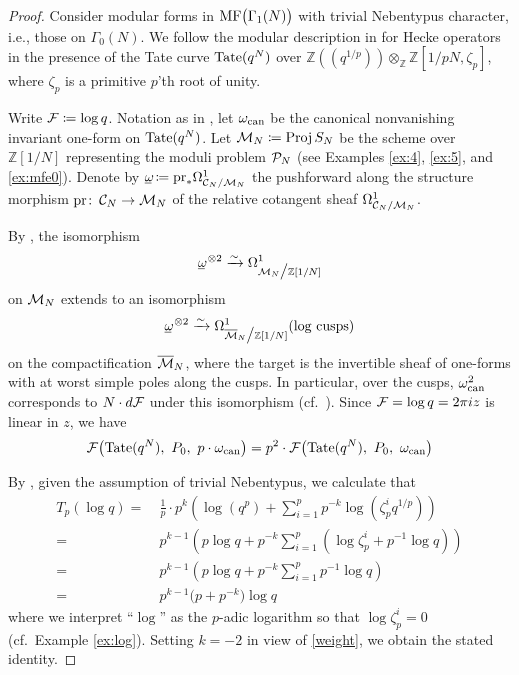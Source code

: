 \documentclass{gtpart}
\theoremstyle{definition}
\theoremstyle{remark}
\def\co{\colon\thinspace}
\newcommand{\mb}[1]{\mathbb{#1}}
\newcommand{\Proj}{{\rm Proj\thinspace}}
\newcommand{\CC}{{\cal C}}
\newcommand{\CF}{{\cal F}}
\newcommand{\CM}{{\cal M}}
\newcommand{\CMB}{\overline {\cal M}}
\newcommand{\CP}{{\cal P}}
\newcommand{\BZ}{{\mb Z}}
\newcommand{\can}{{\rm can}}
\newcommand{\MF}{{\rm MF}}
\newcommand{\G}{\Gamma}
\renewcommand{\o}{\omega}
\newcommand{\ou}{\underline{\omega\!}}
\newcommand{\ce}{\coloneqq}
\newcommand{\lp}{(\!(}
\newcommand{\rp}{)\!)}
\renewcommand{\=}{\approx}
\renewcommand{\-}{\sim}
\newcommand{\Tate}{{\rm Tate}}
\numberwithin{equation}{section}
\numberwithin{thm}{section}
\begin{document}
\begin{proof}
 Consider modular forms in $\MF\big(\G_1(N)\big)$ with trivial Nebentypus 
 character, i.e., those on $\G_0(N)$.  We follow the modular description in 
 \cite[Section 1.11]{padicprop} for Hecke operators in the presence of the Tate 
 curve $\Tate(q^N)$ over 
 $\BZ \lp q^{1 / p} \rp \otimes_\BZ \BZ [1 / p N, \zeta_p]$, where $\zeta_p$ is 
 a primitive $p$'th root of unity.  

 Write $\CF \ce \log q$.  Notation as in \cite[Section 1.2]{padicprop}, let 
 $\o_\can$ be the canonical nonvanishing invariant one-form on $\Tate(q^N)$.  
 Let $\CM_N \ce \Proj S_N$ be the scheme over $\BZ[1/N]$ representing the moduli 
 problem $\CP_N$ (see Examples \ref{ex:4}, \ref{ex:5}, and \ref{ex:mfe0}).  
 Denote by $\ou \ce {\rm pr}_* \Omega^1_{\CC_N/\CM_N}$ the pushforward along the 
 structure morphism ${\rm pr} \co \CC_N \to \CM_N$ of the relative cotangent 
 sheaf $\Omega^1_{\CC_N/\CM_N}$.  

 By \cite[Theorem 10.13.11]{KM}, the isomorphism 
 \[
  \ou^{~\! \otimes 2} \xrightarrow{\sim} \Omega^1_{\CM_N \big/ \BZ[1/N]} 
 \]
 on $\CM_N$ extends to an isomorphism 
 \[
  \ou^{~\! \otimes 2} \xrightarrow{\sim} 
  \Omega^1_{\CMB_N \big/ \BZ[1/N]} (\text{log cusps}) 
 \]
 on the compactification $\CMB_N$, where the target is the invertible sheaf of 
 one-forms with at worst simple poles along the cusps.  In particular, over the 
 cusps, $\o_\can^2$ corresponds to $N \cdot d\CF$ under this isomorphism 
 (cf.~\cite[Section 1.5]{padicprop}).  Since $\CF = \log q = 2 \pi i z$ is 
 linear in $z$, we have 
 \begin{equation}
  \label{weight}
  \CF \big( \Tate(q^N), ~ P_0, ~ p \cdot \o_\can \big) = 
  p^2 \cdot \CF \big( \Tate(q^N), ~ P_0, ~ \o_\can \big) 
 \end{equation}

 By \cite[(1.11.0.3) and (1.11.0.4)]{padicprop}, given the assumption of trivial 
 Nebentypus, we calculate  that 
 \begin{equation}
  \label{Tplogq}
  \begin{split}
   T_p (\log q) = & ~ \frac{1}{p}\cdot p^k \left( \log(q^p) + \sum_{i = 1}^p 
                    p^{-k} \log(\zeta_p^i q^{1/p}) \right) \\
                = & ~ p^{k - 1} \left( p \log q + p^{-k} \sum_{i = 1}^p 
                    (\log \zeta_p^i + p^{-1} \log q) \right) \\
                = & ~ p^{k - 1} \left( p \log q + p^{-k} \sum_{i = 1}^p 
                    p^{-1} \log q \right) \\
                = & ~ p^{k - 1} \big( p + p^{-k} \big) \log q 
  \end{split}
 \end{equation}
 where we interpret ``$\log$'' as the $p$-adic logarithm so that 
 $\log \zeta_p^i = 0$ (cf.~Example \ref{ex:log}).  Setting $k = -2$ in view of 
 \eqref{weight}, we obtain the stated identity.  
\end{proof}
\end{document}
